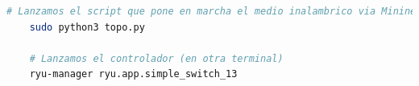 \begin{lstlisting}[language= bash, style=Consola, caption={Puesta en marcha del BOFUSS},label=code:bofussLaunch]
    # Lanzamos el script que pone en marcha el medio inalambrico via Mininet-WiFi
    sudo python3 topo.py
   
    # Lanzamos el controlador (en otra terminal)
    ryu-manager ryu.app.simple_switch_13
\end{lstlisting}
\vspace{0.5cm}
